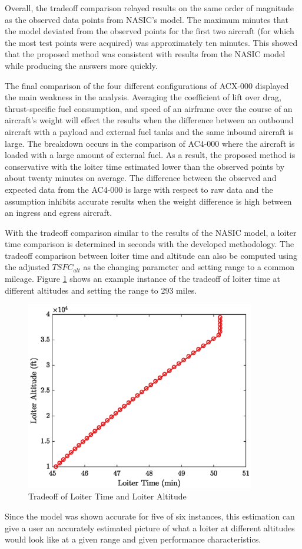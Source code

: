 Overall, the tradeoff comparison relayed results on the same order of magnitude as the observed data points from NASIC's model. The maximum minutes that the model deviated from the observed points for the first two aircraft (for which the most test points were acquired) was approximately ten minutes. This showed that the proposed method was consistent with results from the NASIC model while producing the answers more quickly.\par
The final comparison of the four different configurations of ACX-000 displayed the main weakness in the analysis. Averaging the coefficient of lift over drag, thrust-specific fuel consumption, and speed of an airframe over the course of an aircraft's weight will effect the results when the difference between an outbound aircraft with a payload and external fuel tanks and the same inbound aircraft is large. The breakdown occurs in the comparison of AC4-000 where the aircraft is loaded with a large amount of external fuel. As a result, the proposed method is conservative with the loiter time estimated lower than the observed points by about twenty minutes on average. The difference between the observed and expected data from the AC4-000 is large with respect to raw data and the assumption inhibits accurate results when the weight difference is high between an ingress and egress aircraft. \par
With the tradeoff comparison similar to the results of the NASIC model, a loiter time comparison is determined in seconds with the developed methodology. The tradeoff comparison between loiter time and altitude can also be computed using the adjusted $TSFC_{alt}$ as the changing parameter and setting range to a common mileage. Figure \ref{fig:LoiterAltvsTime} shows an example instance of the tradeoff of loiter time at different altitudes and setting the range to 293 miles.
\begin{figure}[H]
    \centering
    \includegraphics[width = 10cm]{Thesis/Analysis/LoiterEnduranceTradeoff.eps}
    \caption{Tradeoff of Loiter Time and Loiter Altitude}
    \label{fig:LoiterAltvsTime}
\end{figure}
Since the model was shown accurate for five of six instances, this estimation can give a user an accurately estimated picture of what a loiter at different altitudes would look like at a given range and given performance characteristics.  




